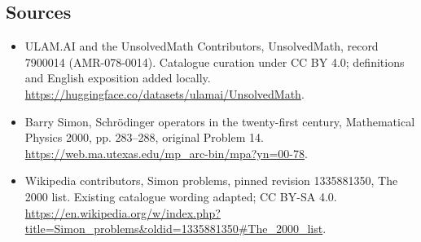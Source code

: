 \documentclass[11pt]{article}
\begin{document}
\subsection{Sources}
\begin{itemize}
\item[\hypertarget{source:7900014:1}{S1}] ULAM.AI and the UnsolvedMath Contributors, UnsolvedMath, record 7900014 (AMR-078-0014). Catalogue curation under CC BY 4.0; definitions and English exposition added locally.
\url{https://huggingface.co/datasets/ulamai/UnsolvedMath}.
\item[\hypertarget{source:7900014:2}{S2}] Barry Simon, Schrödinger operators in the twenty-first century, Mathematical Physics 2000, pp. 283–288, original Problem 14.
\url{https://web.ma.utexas.edu/mp_arc-bin/mpa?yn=00-78}.
\item[\hypertarget{source:7900014:3}{S3}] Wikipedia contributors, Simon problems, pinned revision 1335881350, The 2000 list. Existing catalogue wording adapted; CC BY-SA 4.0.
\url{https://en.wikipedia.org/w/index.php?title=Simon_problems&oldid=1335881350#The_2000_list}.
\end{itemize}
\label{end:7900014}
\end{document}
